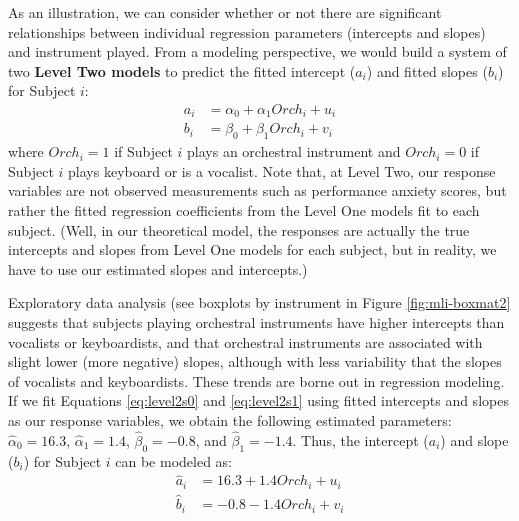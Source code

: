 \documentclass[
]{krantz}
\begin{document}
As an illustration, we can consider whether or not there are significant relationships between individual regression parameters (intercepts and slopes) and instrument played. From a modeling perspective, we would build a system of two \textbf{Level Two models} to predict the fitted intercept (\(a_{i}\)) and fitted slopes (\(b_{i}\)) for Subject \(i\):
\begin{align}
a_{i} & =  \alpha_{0}+\alpha_{1}\textstyle{Orch}_{i}+u_{i}
\label{eq:level2s0}  \\
b_{i} & =  \beta_{0}+\beta_{1}\textstyle{Orch}_{i}+v_{i}
\label{eq:level2s1}
\end{align}
where \(\textstyle{Orch}_{i}=1\) if Subject \(i\) plays an orchestral instrument and \(\textstyle{Orch}_{i}=0\) if Subject \(i\) plays keyboard or is a vocalist. Note that, at Level Two, our response variables are not observed measurements such as performance anxiety scores, but rather the fitted regression coefficients from the Level One models fit to each subject. (Well, in our theoretical model, the responses are actually the true intercepts and slopes from Level One models for each subject, but in reality, we have to use our estimated slopes and intercepts.)

Exploratory data analysis (see boxplots by instrument in Figure \ref{fig:mli-boxmat2} suggests that subjects playing orchestral instruments have higher intercepts than vocalists or keyboardists, and that orchestral instruments are associated with slight lower (more negative) slopes, although with less variability that the slopes of vocalists and keyboardists. These trends are borne out in regression modeling. If we fit Equations \eqref{eq:level2s0} and \eqref{eq:level2s1} using fitted intercepts and slopes as our response variables, we obtain the following estimated parameters: \(\hat{\alpha}_{0}=16.3\), \(\hat{\alpha}_{1}=1.4\), \(\hat{\beta}_{0}=-0.8\), and \(\hat{\beta}_{1}=-1.4\). Thus, the intercept (\(a_{i}\)) and slope (\(b_{i}\)) for Subject \(i\) can be modeled as:
\begin{align}
\hat{a}_{i} & = 16.3+1.4\textstyle{Orch}_{i}+u_{i}
\label{eq:level2s0hat}  \\
\hat{b}_{i} & = -0.8-1.4\textstyle{Orch}_{i}+v_{i}
\label{eq:level2s1hat}
\end{align}
\end{document}
